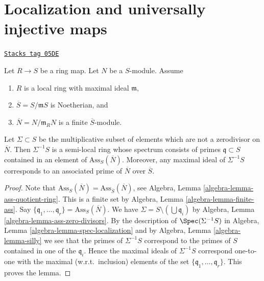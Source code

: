 \section{Localization and universally injective maps}
\label{flat-section-localize-universally-injective}
\begin{lemma}
\label{flat-lemma-homothety-spectrum}
\href{https://stacks.math.columbia.edu/tag/05DE}{\texttt{Stacks tag 05DE}}

Let $R \to S$ be a ring map.
Let $N$ be a $S$-module.
Assume
\begin{enumerate}
\item $R$ is a local ring with maximal ideal $\mathfrak m$,
\item $\overline{S} = S/\mathfrak m S$ is Noetherian, and
\item $\overline{N} = N/\mathfrak m_R N$ is a finite $\overline{S}$-module.
\end{enumerate}
Let $\Sigma \subset S$ be the multiplicative subset of elements which are not
a zerodivisor on $\overline{N}$. Then $\Sigma^{-1}S$ is a semi-local ring
whose spectrum consists of primes $\mathfrak q \subset S$ contained in an
element of $\text{Ass}_S(\overline{N})$. Moreover, any maximal
ideal of $\Sigma^{-1}S$ corresponds to an associated prime of
$\overline{N}$ over $\overline{S}$.
\end{lemma}

\begin{proof}
Note that
$\text{Ass}_S(\overline{N}) = \text{Ass}_{\overline{S}}(\overline{N})$, see
Algebra, Lemma \ref{algebra-lemma-ass-quotient-ring}.
This is a finite set by
Algebra, Lemma \ref{algebra-lemma-finite-ass}.
Say $\{\mathfrak q_1, \ldots, \mathfrak q_r\} = \text{Ass}_S(\overline{N})$.
We have $\Sigma = S \setminus (\bigcup \mathfrak q_i)$ by
Algebra, Lemma \ref{algebra-lemma-ass-zero-divisors}.
By the description of $\Spec(\Sigma^{-1}S)$ in
Algebra, Lemma \ref{algebra-lemma-spec-localization}
and by
Algebra, Lemma \ref{algebra-lemma-silly}
we see that the primes of $\Sigma^{-1}S$ correspond to the primes of
$S$ contained in one of the $\mathfrak q_i$.
Hence the maximal ideals of $\Sigma^{-1}S$ correspond one-to-one with the
maximal (w.r.t.\ inclusion) elements of the set
$\{\mathfrak q_1, \ldots, \mathfrak q_r\}$. This proves the lemma.
\end{proof}

